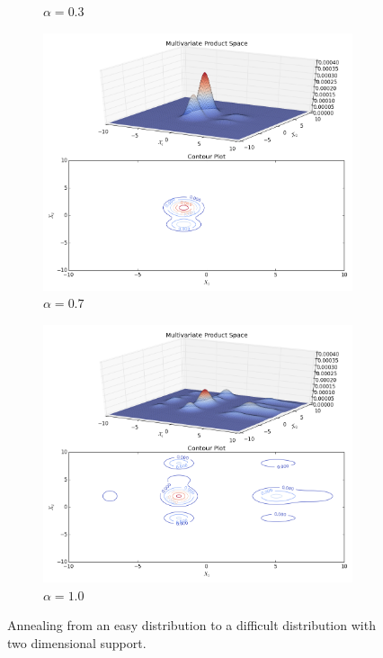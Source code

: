 \documentclass[12pt]{elsarticle}
\begin{document}
\begin{figure}
\begin{subfigure}[b]{0.49\textwidth}
        \caption{$\alpha = 0.3$}
        \label{fig:three sin x}
    \end{subfigure}
    \hfill
    \begin{subfigure}[b]{0.49\textwidth}
        \centering
       \includegraphics[width = \textwidth, trim = 3cm 11.7cm 1cm 0.5cm, clip]{plots/Annealing-Normalised/Normalised-Mix-Gaussian-anealing-animation0_70.png}
        \caption{$\alpha = 0.7$}
        \label{fig:five over x}
    \end{subfigure}
    \hfill
        \begin{subfigure}[b]{0.49\textwidth}
        \centering
       \includegraphics[width = \textwidth, trim = 3cm 11.7cm 1cm 0.5cm, clip]{plots/Annealing-Normalised/Normalised-Mix-Gaussian-anealing-animation1_00.png}
        \caption{$\alpha = 1.0$}
        \label{fig:five over x}
    \end{subfigure}
    \caption{Annealing from an easy distribution to a difficult distribution with two dimensional support.}
    \label{annealing}
\end{figure}
\end{document}
